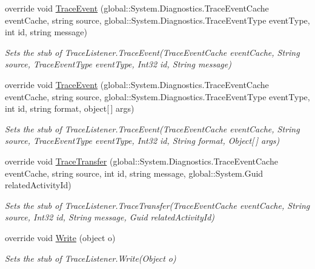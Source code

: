 \begin{DoxyCompactItemize}
override void \hyperlink{class_system_1_1_diagnostics_1_1_fakes_1_1_stub_text_writer_trace_listener_a7e597027b269e0b5f1f39092954c7e37}{Trace\-Event} (global\-::\-System.\-Diagnostics.\-Trace\-Event\-Cache event\-Cache, string source, global\-::\-System.\-Diagnostics.\-Trace\-Event\-Type event\-Type, int id, string message)
\begin{DoxyCompactList}\small\item\em Sets the stub of Trace\-Listener.\-Trace\-Event(\-Trace\-Event\-Cache event\-Cache, String source, Trace\-Event\-Type event\-Type, Int32 id, String message)\end{DoxyCompactList}\item 
override void \hyperlink{class_system_1_1_diagnostics_1_1_fakes_1_1_stub_text_writer_trace_listener_ab6fff9f203abc76141cd858c94481b0e}{Trace\-Event} (global\-::\-System.\-Diagnostics.\-Trace\-Event\-Cache event\-Cache, string source, global\-::\-System.\-Diagnostics.\-Trace\-Event\-Type event\-Type, int id, string format, object\mbox{[}$\,$\mbox{]} args)
\begin{DoxyCompactList}\small\item\em Sets the stub of Trace\-Listener.\-Trace\-Event(\-Trace\-Event\-Cache event\-Cache, String source, Trace\-Event\-Type event\-Type, Int32 id, String format, Object\mbox{[}$\,$\mbox{]} args)\end{DoxyCompactList}\item 
override void \hyperlink{class_system_1_1_diagnostics_1_1_fakes_1_1_stub_text_writer_trace_listener_aa79963ee07f9142322f92e7248a54793}{Trace\-Transfer} (global\-::\-System.\-Diagnostics.\-Trace\-Event\-Cache event\-Cache, string source, int id, string message, global\-::\-System.\-Guid related\-Activity\-Id)
\begin{DoxyCompactList}\small\item\em Sets the stub of Trace\-Listener.\-Trace\-Transfer(\-Trace\-Event\-Cache event\-Cache, String source, Int32 id, String message, Guid related\-Activity\-Id)\end{DoxyCompactList}\item 
override void \hyperlink{class_system_1_1_diagnostics_1_1_fakes_1_1_stub_text_writer_trace_listener_aa1ee5b7a36b3df4aed1e9cdd1627e3b1}{Write} (object o)
\begin{DoxyCompactList}\small\item\em Sets the stub of Trace\-Listener.\-Write(\-Object o)\end{DoxyCompactList}\item 

\end{DoxyCompactItemize}
